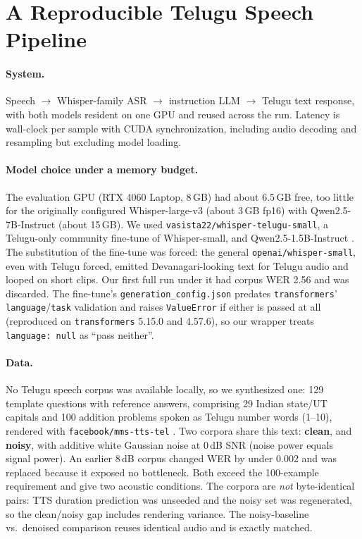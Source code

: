 \documentclass[11pt,a4paper,twocolumn]{article}
\begin{document}
\section{A Reproducible Telugu Speech Pipeline}
\label{sec:system}

\paragraph{System.} Speech $\rightarrow$ Whisper-family ASR $\rightarrow$ instruction LLM $\rightarrow$ Telugu text response, with both models resident on one GPU and reused across the run. Latency is wall-clock per sample with CUDA synchronization, including audio decoding and resampling but excluding model loading.

\paragraph{Model choice under a memory budget.} The evaluation GPU (RTX 4060 Laptop, 8\,GB) had about 6.5\,GB free, too little for the originally configured Whisper-large-v3 (about 3\,GB fp16) with Qwen2.5-7B-Instruct (about 15\,GB). We used \texttt{vasista22/whisper-telugu-small}, a Telugu-only community fine-tune of Whisper-small, and Qwen2.5-1.5B-Instruct \citep{qwen25}. The substitution of the fine-tune was forced: the general \texttt{openai/whisper-small}, even with Telugu forced, emitted Devanagari-looking text for Telugu audio and looped on short clips. Our first full run under it had corpus WER 2.56 and was discarded. The fine-tune's \texttt{generation\_config.json} predates \texttt{transformers}' \texttt{language}/\texttt{task} validation and raises \texttt{ValueError} if either is passed at all (reproduced on \texttt{transformers} 5.15.0 and 4.57.6), so our wrapper treats \texttt{language: null} as ``pass neither''.

\paragraph{Data.} No Telugu speech corpus was available locally, so we synthesized one: 129 template questions with reference answers, comprising 29 Indian state/UT capitals and 100 addition problems spoken as Telugu number words (1--10), rendered with \texttt{facebook/mms-tts-tel} \citep{mms}. Two corpora share this text: \textbf{clean}, and \textbf{noisy}, with additive white Gaussian noise at 0\,dB SNR (noise power equals signal power). An earlier 8\,dB corpus changed WER by under 0.002 and was replaced because it exposed no bottleneck. Both exceed the 100-example requirement and give two acoustic conditions. The corpora are \emph{not} byte-identical pairs: TTS duration prediction was unseeded and the noisy set was regenerated, so the clean/noisy gap includes rendering variance. The noisy-baseline vs.\ denoised comparison reuses identical audio and is exactly matched.
\end{document}
